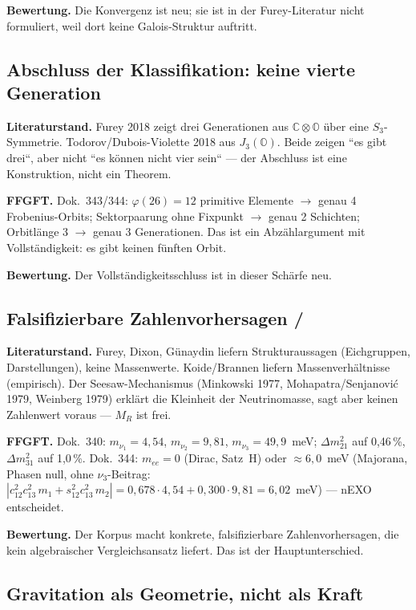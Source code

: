 \textbf{Bewertung.} Die Konvergenz ist neu; sie ist in der Furey-Literatur
nicht formuliert, weil dort keine Galois-Struktur auftritt.

\subsection{Abschluss der Klassifikation: keine vierte Generation \BM}

\textbf{Literaturstand.} Furey 2018 zeigt drei Generationen aus
$\mathbb{C}\otimes\mathbb{O}$ über eine $S_3$-Symmetrie. Todorov/Dubois-Violette
2018 aus $J_3(\mathbb{O})$. Beide zeigen ``es gibt drei``, aber nicht
``es können nicht vier sein`` --- der Abschluss ist eine Konstruktion,
nicht ein Theorem.

\textbf{FFGFT.} Dok.~343/344: $\varphi(26)=12$ primitive Elemente
$\to$ genau 4 Frobenius-Orbits; Sektorpaarung ohne Fixpunkt
$\to$ genau 2 Schichten; Orbitlänge 3 $\to$ genau 3 Generationen.
Das ist ein Abzählargument mit Vollständigkeit: es gibt keinen fünften Orbit.

\textbf{Bewertung.} Der Vollständigkeitsschluss ist in dieser Schärfe neu.

\subsection{Falsifizierbare Zahlenvorhersagen \KM/\BM}

\textbf{Literaturstand.} Furey, Dixon, Günaydin liefern Strukturaussagen
(Eichgruppen, Darstellungen), keine Massenwerte. Koide/Brannen liefern
Massenverhältnisse (empirisch). Der Seesaw-Mechanismus (Minkowski 1977,
Mohapatra/Senjanović 1979, Weinberg 1979) erklärt die Kleinheit der
Neutrinomasse, sagt aber keinen Zahlenwert voraus --- $M_R$ ist frei.

\textbf{FFGFT.} Dok.~340: $m_{\nu_1}=4{,}54$, $m_{\nu_2}=9{,}81$,
$m_{\nu_3}=49{,}9$~meV; $\Delta m^2_{21}$ auf 0,46\,\%, $\Delta m^2_{31}$
auf 1,0\,\%. Dok.~344: $m_{ee}=0$ (Dirac, Satz~H) oder $\approx6{,}0$~meV
(Majorana, Phasen null, ohne $\nu_3$-Beitrag: $|c_{12}^2c_{13}^2\,m_1 + s_{12}^2c_{13}^2\,m_2| =
0{,}678\cdot4{,}54 + 0{,}300\cdot9{,}81 = 6{,}02$~meV) --- nEXO entscheidet.

\textbf{Bewertung.} Der Korpus macht konkrete, falsifizierbare Zahlenvorhersagen,
die kein algebraischer Vergleichsansatz liefert. Das ist der Hauptunterschied.

\subsection{Gravitation als Geometrie, nicht als Kraft \BM}


